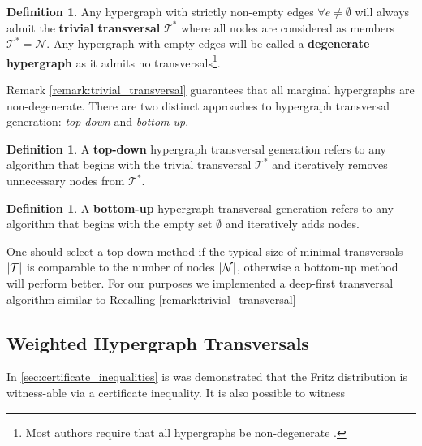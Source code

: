 \documentclass[aps, 10pt, english, twoside, pra, nofootinbib, longbibliography]{revtex4-1}
\theoremstyle{plain}
\theoremstyle{definition}
\newtheorem{definition}[theorem]{Definition}
\theoremstyle{remark}
\newcommand{\nodes}{\mathcal{N}}
\newcommand{\trans}{\mathcal{T}}
\newcommand{\term}[1]{\textcolor{Mahogany}{\textbf{#1}}}
\begin{document}
    \begin{definition}
        Any hypergraph with strictly non-empty edges $\forall e \neq \emptyset$ will always admit the \term{trivial transversal} $\trans^*$ where all nodes are considered as members $\trans^* = \nodes$. Any hypergraph with empty edges will be called a \term{degenerate hypergraph} as it admits no transversals\footnote{Most authors require that all hypergraphs be non-degenerate \cite{Kavvadias_2005}.}.
    \end{definition}
    Remark \ref{remark:trivial_transversal} guarantees that all marginal hypergraphs are non-degenerate. There are two distinct approaches to hypergraph transversal generation: \textit{top-down} and \textit{bottom-up}.
    \begin{definition}
        A \term{top-down} hypergraph transversal generation refers to any algorithm that begins with the trivial transversal $\trans^*$ and iteratively removes unnecessary nodes from $\trans^*$.
    \end{definition}

    \begin{definition}
        A \term{bottom-up} hypergraph transversal generation refers to any algorithm that begins with the empty set $\emptyset$ and iteratively adds nodes.
    \end{definition}

    One should select a top-down method if the typical size of minimal transversals $\abs{\trans}$ is comparable to the number of nodes $\abs{\nodes}$, otherwise a bottom-up method will perform better.
    For our purposes we implemented a deep-first transversal algorithm similar to
    Recalling \cref{remark:trivial_transversal}

    \subsection{Weighted Hypergraph Transversals}
    In \cref{sec:certificate_inequalities} is was demonstrated that the Fritz distribution is witness-able via a certificate inequality. It is also possible to witness

\end{document}
